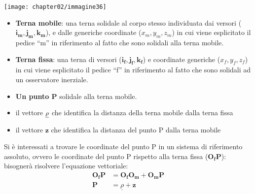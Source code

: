 			\begin{minipage}{.55\textwidth}
				\centering
				\texttt{[image: chapter02/immagine36]}
			\end{minipage}
			\hfill
			\begin{minipage}{.45\textwidth}
				\begin{itemize}
					\item  \textbf{Terna mobile}:  una terna solidale al corpo stesso individuata dai versori ($\mathbf{i_m}, \mathbf{j_m}, \mathbf{k_m}$), e dalle generiche coordinate ($x_m, y_m, z_m$) in cui viene esplicitato il pedice ``m'' in riferimento al fatto che sono solidali alla terna mobile.
					\item \textbf{Terna fissa}: una terna di versori ($\mathbf{i_f}, \mathbf{j_f}, \mathbf{k_f}$) e coordinate generiche  ($x_f, y_f, z_f$)  in cui viene esplicitato il pedice ``f'' in riferimento al fatto che sono solidali ad un osservatore inerziale.
					\item \textbf{Un punto P} solidale alla terna mobile.
					\item il vettore $\underline{\rho}$ che identifica la distanza della terna mobile dalla terna fissa
					\item il vettore $\mathbf{z}$ che identifica la distanza del punto P dalla terna mobile
				\end{itemize}
			\end{minipage}
			\vspace{1mm}
		
				Si è interessati a trovare le coordinate del punto P in un sistema di riferimento assoluto, ovvero le coordinate del punto P rispetto alla terna fissa ($\mathbf{O_fP}$): bisognerà risolvere l'equazione vettoriale:
			\begin{equation*}
				\begin{split}
					\mathbf{O_fP} &= \mathbf{O_fO_m} + \mathbf{O_mP}\\
					\mathbf{P} &= \underline{\rho} + \mathbf{z}
				\end{split}
			\end{equation*}

